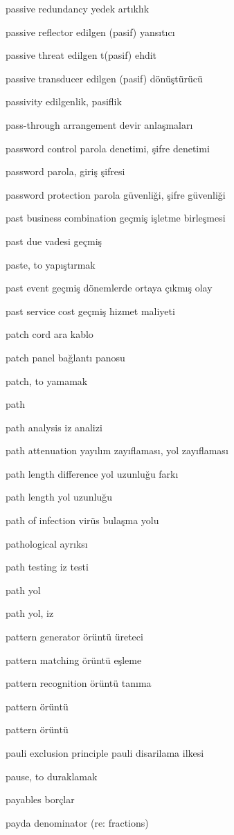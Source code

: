 \documentclass[12pt,fleqn]{article}\usepackage{../../common}
\begin{document}
passive redundancy yedek artıklık

passive reflector edilgen (pasif) yansıtıcı

passive threat edilgen t(pasif) ehdit

passive transducer edilgen (pasif) dönüştürücü

passivity edilgenlik, pasiflik

pass-through arrangement devir anlaşmaları

password control parola denetimi, şifre denetimi

password parola, giriş şifresi

password protection parola güvenliği, şifre güvenliği

past business combination geçmiş işletme birleşmesi

past due vadesi geçmiş

paste, to yapıştırmak

past event geçmiş dönemlerde ortaya çıkmış olay

past service cost geçmiş hizmet maliyeti

patch cord ara kablo

patch panel bağlantı panosu

patch, to yamamak

path

path analysis iz analizi

path attenuation yayılım zayıflaması, yol zayıflaması

path length difference yol uzunluğu farkı

path length yol uzunluğu

path of infection virüs bulaşma yolu

pathological ayrıksı

path testing iz testi

path yol

path yol, iz

pattern generator örüntü üreteci

pattern matching örüntü eşleme

pattern recognition örüntü tanıma

pattern örüntü

pattern örüntü

pauli exclusion principle pauli disarilama ilkesi

pause, to duraklamak

payables borçlar

payda denominator (re: fractions)
\end{document}
